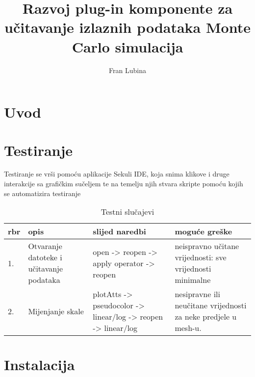 \documentclass[times, utf8, zavrsni]{fer}
\begin{document}

\title{Razvoj plug-in komponente za učitavanje izlaznih podataka Monte Carlo simulacija}


\author{Fran Lubina}

\maketitle

\izvornik


\tableofcontents

\chapter{Uvod}

\chapter{Testiranje}
Testiranje se vrši pomoću aplikacije Sekuli IDE, koja snima klikove i druge interakcije sa grafičkim sučeljem te na temelju njih stvara skripte pomoću kojih se automatizira testiranje
	
	\begin{table}[H]
        \centering
        \def\arraystretch{1.5}
        \begin{tabular}{|l|p{80pt}| p{120pt} | p{120pt} |}
        \hline
        rbr & opis & slijed naredbi & moguće greške\\ \hline
        1. & Otvaranje datoteke i učitavanje podataka & open -> reopen -> apply operator ->     reopen & neispravno učitane vrijednosti: sve vrijednosti minimalne\\
        \hline
        2. & Mijenjanje skale & plotAtts -> pseudocolor -> linear/log -> reopen -> linear/log & nesipravne ili neučitane vrijednosti za neke predjele u mesh-u.\\
        \hline
        \end{tabular}
        \caption{Testni slučajevi}
        \end{table}
	


\chapter{Instalacija}
\end{document}
